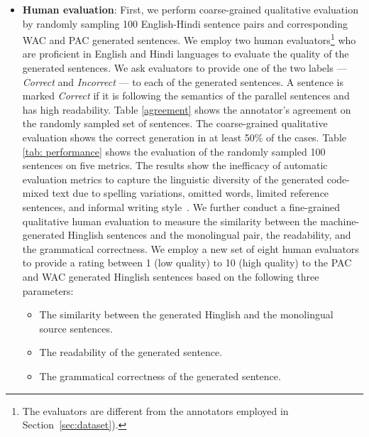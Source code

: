 \documentclass[11pt]{article}
\begin{document}
\begin{itemize}
    \item \textbf{Human evaluation}: First, we perform coarse-grained qualitative evaluation by randomly sampling 100 English-Hindi sentence pairs and corresponding WAC and PAC generated sentences. We employ two human evaluators\footnote{The evaluators are different from the annotators employed in Section~\ref{sec:dataset}).} who are proficient in English and Hindi languages to evaluate the quality of the generated sentences. We ask evaluators to provide one of the two labels --- \textit{Correct} and \textit{Incorrect} --- to each of the generated sentences. A sentence is marked \textit{Correct} if it is following the semantics of the parallel sentences and has high readability. Table \ref{agreement} shows the annotator's agreement on the randomly sampled set of sentences. The coarse-grained qualitative evaluation shows the correct generation in at least 50\% of the cases. Table \ref{tab: performance} shows the evaluation of the randomly sampled 100 sentences on five metrics. The results show the inefficacy of automatic evaluation metrics to capture the linguistic diversity of the generated code-mixed text due to spelling variations, omitted words, limited reference sentences, and informal writing style~\cite{srivastava2020phinc}.
    We further conduct a fine-grained qualitative human evaluation to measure the similarity between the machine-generated Hinglish sentences and the monolingual pair, the readability, and the grammatical correctness. We employ a new set of eight human evaluators to provide a rating between 1 (low quality) to 10 (high quality) to the PAC and WAC generated Hinglish sentences based on the following three parameters:
    \begin{itemize}
     \item The similarity between the generated Hinglish and the monolingual source sentences.
     \item The readability of the generated sentence.
     \item The grammatical correctness of the generated sentence.
    \end{itemize}
    

\end{itemize}
\end{document}
